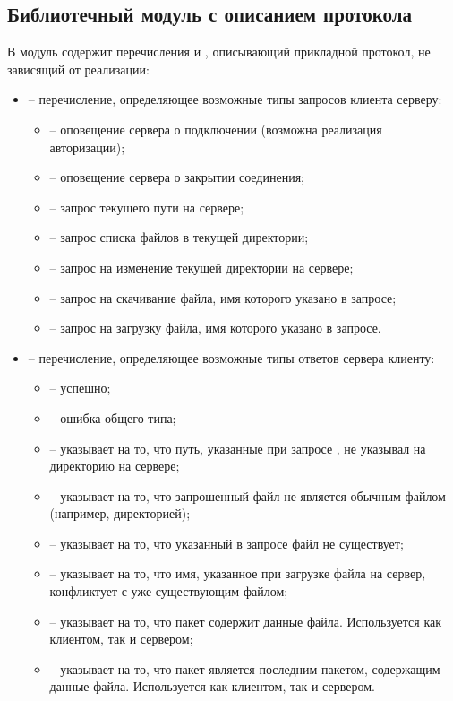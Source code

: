 \subsection{Библиотечный модуль с описанием протокола}

В модуль  содержит перечисления  и , описывающий прикладной протокол, не зависящий от реализации:
\begin{itemize}
	\item {} -- перечисление, определяющее возможные типы запросов клиента серверу:
	\begin{itemize}
		\item {} -- оповещение сервера о подключении (возможна реализация авторизации);
		\item {} -- оповещение сервера о закрытии соединения;
		\item {} -- запрос текущего пути на сервере;
		\item {} -- запрос списка файлов в текущей директории;
		\item {} -- запрос на изменение текущей директории на сервере;
		\item {} -- запрос на скачивание файла, имя которого указано в запросе;
		\item {} -- запрос на загрузку файла, имя которого указано в запросе.
	\end{itemize}
	\item {} -- перечисление, определяющее возможные типы ответов сервера клиенту:
	\begin{itemize}
		\item {} -- успешно;
		\item {} -- ошибка общего типа;
		\item {} -- указывает на то, что путь, указанные при запросе , не указывал на директорию на сервере;
		\item {} -- указывает на то, что запрошенный файл не является обычным файлом (например, директорией);
		\item {} -- указывает на то, что указанный в запросе файл не существует;
		\item {} -- указывает на то, что имя, указанное при загрузке файла на сервер, конфликтует с уже существующим файлом;
		\item {} -- указывает на то, что пакет содержит данные файла. Используется как клиентом, так и сервером;
		\item {} -- указывает на то, что пакет является последним пакетом, содержащим данные файла. Используется как клиентом, так и сервером.
	\end{itemize}
\end{itemize}


